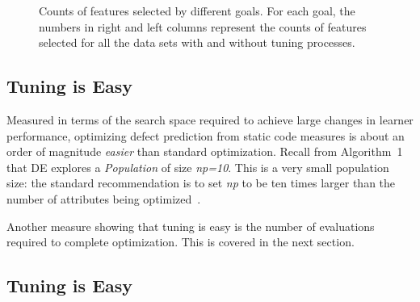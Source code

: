 \documentclass{sig-alternative}
\begin{document}
\begin{figure}[!h]
\begin{tabular}{c|c c|c c|c c|c c| c c }
  \end{tabular}
    \caption{Counts of features selected by different goals. For each goal, the numbers in right and left columns represent the counts of features selected for all the data sets with and without tuning processes.
    }\label{fig:counts}
\end{figure}




\subsection{Tuning is Easy}\label{sect:easy}

Measured in terms of the search space
required to achieve large changes in learner performance, optimizing defect prediction from static code
measures is about an order of magnitude {\em easier} than standard optimization.
Recall from Algorithm~1 that
DE explores a {\em Population} of size {\em np=10}. This is a very small population size:
the standard recommendation is to set {\em np} to be ten times larger than the number
of attributes being optimized~\cite{stron97}. 

Another measure showing that tuning is easy is the number of evaluations required to complete optimization.
This is covered in the next section.


\subsection{Tuning is Easy}\label{sect:easy}
 
\end{document}
